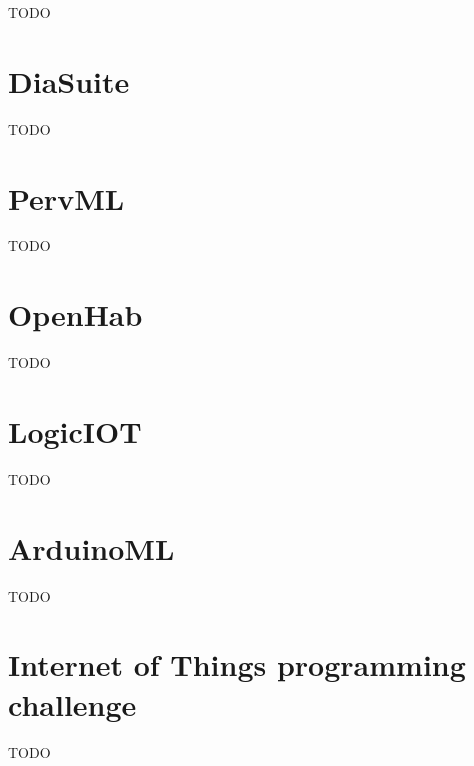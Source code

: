 TODO

\section{DiaSuite}
\label{sec:diasuite}

TODO
\section{PervML}
\label{sec:pervml}

TODO
\section{OpenHab}
\label{sec:openhab}

TODO
\section{LogicIOT}
\label{sec:logic-iot}

TODO
\section{ArduinoML}
\label{sec:arduino-ml}

TODO
\section{Internet of Things programming challenge}
\label{sec:iot-prog-challenge}

TODO

